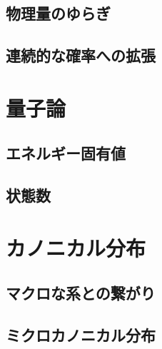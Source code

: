 \documentclass[a4paper]{jsreport}
\begin{document}
        \section{物理量のゆらぎ}


        \section{連続的な確率への拡張}

        
    \chapter{量子論}
        \section{エネルギー固有値}
        \section{状態数}

    \chapter{カノニカル分布}
        \section{マクロな系との繋がり}
        \section{ミクロカノニカル分布}
        \section{}
        \section{}
        \section{}
        \section{}
        \section{}
        \section{}
\end{document}
